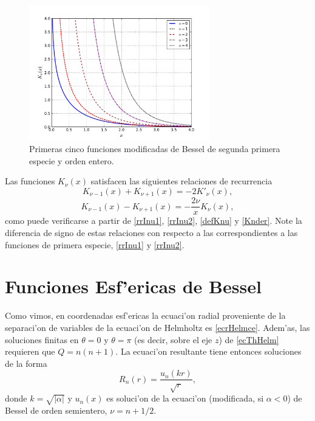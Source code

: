 \begin{figure}[H]
\centering
\includegraphics[angle=0,width=0.7\textwidth]{figs/fig-Bessel-K.pdf}
\caption{Primeras cinco funciones modificadas de Bessel de segunda primera especie y orden entero.}
\label{fig-Kn}
\end{figure}
Las funciones $K_\nu(x)$ satisfacen las siguientes relaciones de recurrencia
\begin{equation}\label{rrKnu1}
K_{\nu-1}(x)+K_{\nu+1}(x)=-2K'_\nu(x),
\end{equation}
\begin{equation}\label{rrKnu2}
K_{\nu-1}(x)-K_{\nu+1}(x)=-\frac{2\nu}{x}K_\nu(x),
\end{equation}
como puede verificarse a partir de \eqref{rrInu1}, \eqref{rrInu2}, \eqref{defKnu} y \eqref{Knder}. Note la diferencia de signo de estas relaciones con respecto a las correspondientes a las funciones de primera especie, \eqref{rrInu1} y \eqref{rrInu2}.

\section{Funciones Esf'ericas de Bessel}
Como vimos, en coordenadas esf'ericas la ecuaci'on radial proveniente de la separaci'on de variables de la ecuaci'on de Helmholtz es \eqref{ecrHelmce}. Adem'as, las soluciones finitas en $\theta=0$ y $\theta=\pi$ (es decir, sobre el eje $z$) de \eqref{ecThHelm} requieren que $Q=n(n+1)$. La ecuaci'on resultante tiene entonces soluciones de la forma
\begin{equation}
R_n(r) = \frac{u_n(kr)}{\sqrt{r}} ,
\end{equation}
donde $k=\sqrt{|\alpha|}$ y $u_n(x)$ es soluci'on de la ecuaci'on (modificada, si $\alpha<0$) de Bessel de orden semientero, $\nu=n+1/2$.

